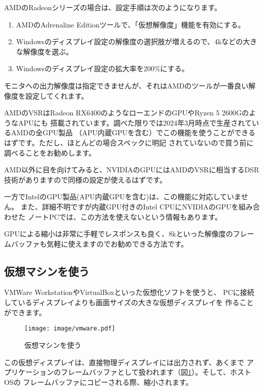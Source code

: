 AMDのRadeonシリーズの場合は、設定手順は次のようになります。


\begin{enumerate}
  \item AMDのAdrenaline Editionツールで、「仮想解像度」機能を有効にする。
  \item Windowsのディスプレイ設定の解像度の選択肢が増えるので、4kなどの大きな解像度を選ぶ。
  \item Windowsのディスプレイ設定の拡大率を200\%にする。
\end{enumerate}

モニタへの出力解像度は指定できませんが、それはAMDのツールが一番良い解像度を設定してくれます。


AMDのVSRはRadeon RX6400のようなローエンドのGPUやRyzen 5 2600GのようなAPUにも
搭載されています。調べた限りでは2024年3月時点で生産されているAMDの全GPU製品
（APU内蔵GPUを含む）でこの機能を使うことができるはずです。ただし、ほとんどの場合スペックに明記
されていないので買う前に調べることをお勧めします。

AMD以外に目を向けてみると、NVIDIAのGPUにはAMDのVSRに相当するDSR技術がありますので同様の設定が使えるはずです。

一方でIntelのGPU製品(APU内蔵GPUを含む)は、この機能に対応していません。
また、詳細不明ですが内蔵GPU付きのIntel CPUにNVIDIAのGPUを組み合わせた
ノートPCでは、この方法を使えないという情報もあります。

GPUによる縮小は非常に手軽でレスポンスも良く、8kといった解像度のフレームバッファも気軽に使えますのでお勧めできる方法です。

\subsection{仮想マシンを使う}
VMWare WorkstationやVirtualBoxといった仮想化ソフトを使うと、
PCに接続しているディスプレイよりも画面サイズの大きな仮想ディスプレイを
作ることができます。

\begin{figure}[btp]
  \begin{center}
    \texttt{[image: image/vmware.pdf]}
    \caption{仮想マシンを使う} \label{fig:vm}
  \end{center}
\end{figure}


この仮想ディスプレイは、直接物理ディスプレイには出力されず、あくまで
アプリケーションのフレームバッファとして扱われます（図\ref{fig:vm}）。そして、ホストOSの
フレームバッファにコピーされる際、縮小されます。

